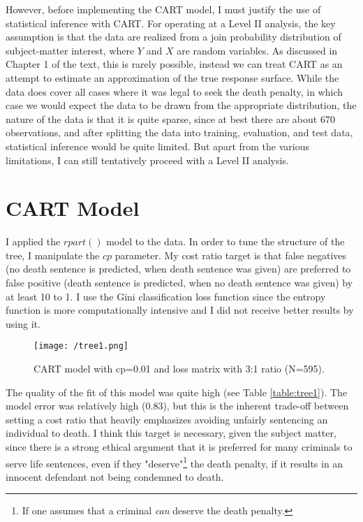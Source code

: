 \documentclass{article}
\begin{document}
However, before implementing the CART model, I must justify the use of statistical inference with CART. For operating at a Level II analysis, the key assumption is that the data are realized from a join probability distribution of subject-matter interest, where $Y$ and $X$ are random variables. As discussed in Chapter 1 of the text, this is rarely possible, instead we can treat CART as an attempt to estimate an approximation of the true response surface. While the data does cover all cases where it was legal to seek the death penalty, in which case we would expect the data to be drawn from the appropriate distribution, the nature of the data is that it is quite sparse, since at best there are about 670 observations, and after splitting the data into training, evaluation, and test data, statistical inference would be quite limited. But apart from the various limitations, I can still tentatively proceed with a Level II analysis. 

\newpage


\section{CART Model}
I applied the $rpart()$ model to the data. In order to tune the structure of the tree, I manipulate the $cp$ parameter. My cost ratio target is that false negatives (no death sentence is predicted, when death sentence was given) are preferred to false positive (death sentence is predicted, when no death sentence was given) by at least 10 to 1. 
I use the Gini classification loss function since the entropy function is more computationally intensive and I did not receive better results by using it.

\begin{figure}[!htb]
    \centering
    \texttt{[image: /tree1.png]}
    \caption{CART model with cp=0.01 and loss matrix with 3:1 ratio (N=595).}
    \label{tree1}
\end{figure}

The quality of the fit of this model was quite high (see Table \ref{table:tree1}). The model error was relatively high (0.83), but this is the inherent trade-off between setting a cost ratio that heavily emphasizes avoiding unfairly sentencing an individual to death. I think this target is necessary, given the subject matter, since there is a strong ethical argument that it is preferred for many criminals to serve life sentences, even if they "deserve"\footnote{If one assumes that a criminal \textit{can} deserve the death penalty.} the death penalty, if it results in an innocent defendant not being condemned to death. 
\end{document}
